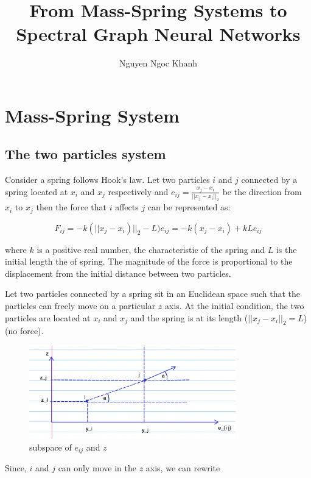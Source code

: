 \documentclass{article}
\title{From Mass-Spring Systems to Spectral Graph Neural Networks}
\author{Nguyen Ngoc Khanh}
\begin{document}
\maketitle

\section{Mass-Spring System}

\subsection{The two particles system}

Consider a spring follows Hook's law. Let two particles $i$ and $j$ connected by a spring located at $x_i$ and $x_j$ respectively and $e_{i j} = \frac{x_j - x_i}{||x_j - x_i||_2}$ be the direction from $x_i$ to $x_j$ then the force that $i$ affects $j$ can be represented as:

\begin{equation}
    F_{i j} = - k (||x_j - x_i)||_2 - L) e_{i j} = - k (x_j - x_i) + k L e_{i j}
\end{equation}

where $k$ is a positive real number, the characteristic of the spring and $L$ is the initial length the of spring. The magnitude of the force is proportional to the displacement from the initial distance between two particles.

Let two particles connected by a spring sit in an Euclidean space such that the particles can freely move on a particular $z$ axis. At the initial condition, the two particles are located at $x_i$ and $x_j$ and the spring is at its length ($||x_j - x_i||_2 = L$) (no force).

\begin{figure}[h!]
\centering
\includegraphics[width=0.8\textwidth]{fig1.png}
\caption{subspace of $e_{i j}$ and $z$}
\label{fig:fig1}
\end{figure}

Since, $i$ and $j$ can only move in the $z$ axis, we can rewrite 
\end{document}
